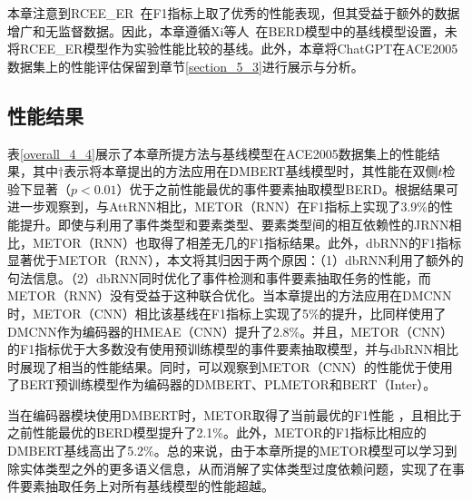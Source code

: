 本章注意到RCEE\_ER~\cite{liu2020event}在F1指标上取了优秀的性能表现，但其受益于额外的数据增广和无监督数据。因此，本章遵循Xi等人~\cite{xiangyu2021capturing}在BERD模型中的基线模型设置，未将RCEE\_ER模型作为实验性能比较的基线。此外，本章将ChatGPT在ACE2005数据集上的性能评估保留到章节\ref{section_5_3}进行展示与分析。

\subsection{性能结果}

表\ref{overall_4_4}展示了本章所提方法与基线模型在ACE2005数据集上的性能结果，其中$\dagger$表示将本章提出的方法应用在DMBERT基线模型时，其性能在双侧$t$检验下显著（$p < 0.01$）优于之前性能最优的事件要素抽取模型BERD。根据结果可进一步观察到，与AttRNN相比，METOR（RNN）在F1指标上实现了3.9\%的性能提升。即使与利用了事件类型和要素类型、要素类型间的相互依赖性的JRNN相比，METOR（RNN）也取得了相差无几的F1指标结果。此外，dbRNN的F1指标显著优于METOR（RNN），本文将其归因于两个原因：（1）dbRNN利用了额外的句法信息。（2）dbRNN同时优化了事件检测和事件要素抽取任务的性能，而METOR（RNN）没有受益于这种联合优化。当本章提出的方法应用在DMCNN时，METOR（CNN）相比该基线在F1指标上实现了5\%的提升，比同样使用了DMCNN作为编码器的HMEAE（CNN）提升了2.8\%。并且，METOR（CNN）的F1指标优于大多数没有使用预训练模型的事件要素抽取模型，并与dbRNN相比时展现了相当的性能结果。同时，可以观察到METOR（CNN）的性能优于使用了BERT预训练模型作为编码器的DMBERT、PLMETOR和BERT（Inter）。

当在编码器模块使用DMBERT时，METOR取得了当前最优的F1性能
，且相比于之前性能最优的BERD模型提升了2.1\%。此外，METOR的F1指标比相应的DMBERT基线高出了5.2\%。总的来说，由于本章所提的METOR模型可以学习到除实体类型之外的更多语义信息，从而消解了实体类型过度依赖问题，实现了在事件要素抽取任务上对所有基线模型的性能超越。

